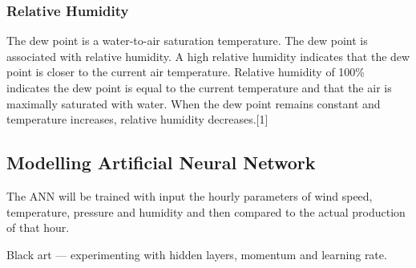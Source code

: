 \subsubsection{Relative Humidity}
The dew point is a water-to-air saturation temperature. The dew point is associated with relative humidity. A high relative humidity indicates that the dew point is closer to the current air temperature. Relative humidity of 100\% indicates the dew point is equal to the current temperature and that the air is maximally saturated with water. When the dew point remains constant and temperature increases, relative humidity decreases.[1]

\subsection{Modelling Artificial Neural Network}
The ANN will be trained with input the hourly parameters of wind speed, temperature, pressure and humidity and then compared to the actual production of that hour.

Black art --- experimenting with hidden layers, momentum and learning rate. 